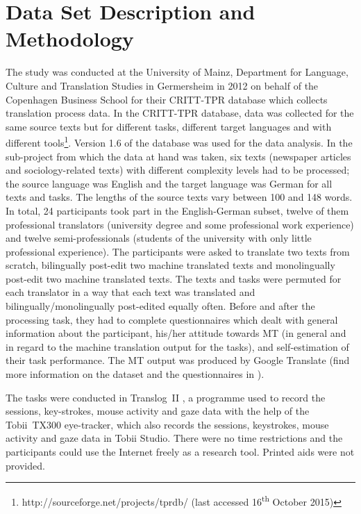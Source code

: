 \documentclass[output=paper]{langsci/langscibook}
\begin{document}
\section{Data Set Description and Methodology\label{nitzke:sec:DataSetDescriptionAndMethodology}}

The study was conducted at the University of Mainz, Department for Language, Culture and Translation Studies in Germersheim in 2012 on behalf of the Copenhagen Business School for their CRITT-TPR database \citep{carl2012critt, carl2013} which collects translation process data. In the CRITT-TPR database, data was collected for the same source texts but for different tasks, different target languages and with different tools\footnote{http://sourceforge.net/projects/tprdb/ (last accessed 16\textsuperscript{th} October 2015)}. Version 1.6 of the database was used for the data analysis. In the sub-project from which the data at hand was taken, six texts (newspaper articles and sociology-related texts) with different complexity levels had to be processed; the source language was English and the target language was German for all texts and tasks. The lengths of the source texts vary between 100 and 148 words. In total, 24 participants took part in the English-German subset, twelve of them professional translators (university degree and some professional work experience) and twelve semi-professionals (students of the university with only little professional experience). The participants were asked to translate two texts from scratch, bilingually post-edit two machine translated texts and monolingually post-edit two machine translated texts. The texts and tasks were permuted for each translator in a way that each text was translated and bilingually/monolingually post-edited equally often. Before and after the processing task, they had to complete questionnaires which dealt with general information about the participant, his/her attitude towards MT (in general and in regard to the machine translation output for the tasks), and self-estimation of their task performance. The MT output was produced by Google Translate (find more information on the dataset and the questionnaires in \citealt{carl2014}).


The tasks were conducted in Translog~II \citep{jakobsen2011, carl2012translog}, a programme used to record the sessions, key-strokes, mouse activity and gaze data with the help of the Tobii~TX300 eye-tracker, which also records the sessions, keystrokes, mouse activity and gaze data in Tobii Studio. There were no time restrictions and the participants could use the Internet freely as a research tool. Printed aids were not provided.
\end{document}

